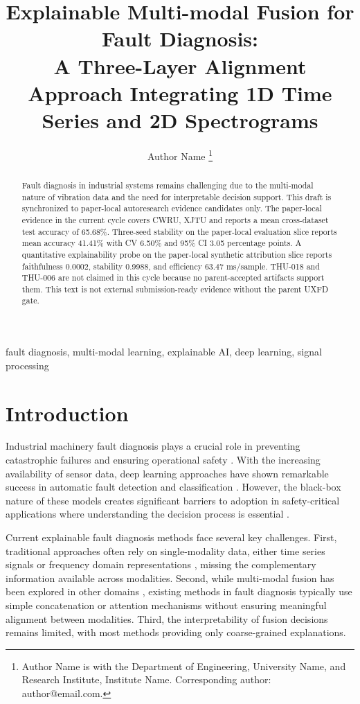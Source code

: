 \documentclass[journal]{IEEEtran}
\title{Explainable Multi-modal Fusion for Fault Diagnosis: \\
A Three-Layer Alignment Approach Integrating 1D Time Series and 2D Spectrograms}
\author{Author Name%
\thanks{Author Name is with the Department of Engineering, University Name, and Research Institute, Institute Name. Corresponding author: author@email.com.}}
\begin{document}
\maketitle

\begin{abstract}
Fault diagnosis in industrial systems remains challenging due to the multi-modal nature of vibration data and the need for interpretable decision support. This draft is synchronized to paper-local autoresearch evidence candidates only. The paper-local evidence in the current cycle covers CWRU, XJTU and reports a mean cross-dataset test accuracy of 65.68\%. Three-seed stability on the paper-local evaluation slice reports mean accuracy 41.41\% with CV 6.50\% and 95\% CI 3.05 percentage points. A quantitative explainability probe on the paper-local synthetic attribution slice reports faithfulness 0.0002, stability 0.9988, and efficiency 63.47 ms/sample. THU-018 and THU-006 are not claimed in this cycle because no parent-accepted artifacts support them. This text is not external submission-ready evidence without the parent UXFD gate.

\end{abstract}

\begin{IEEEkeywords}
fault diagnosis, multi-modal learning, explainable AI, deep learning, signal processing
\end{IEEEkeywords}

\section{Introduction}

Industrial machinery fault diagnosis plays a crucial role in preventing catastrophic failures and ensuring operational safety \cite{smith2020fault}. With the increasing availability of sensor data, deep learning approaches have shown remarkable success in automatic fault detection and classification \cite{liu2021deep, chen2022intelligent}. However, the black-box nature of these models creates significant barriers to adoption in safety-critical applications where understanding the decision process is essential \cite{rudin2019please}.

Current explainable fault diagnosis methods face several key challenges. First, traditional approaches often rely on single-modality data, either time series signals \cite{zhang2020intelligent} or frequency domain representations \cite{wang2021convolutional}, missing the complementary information available across modalities. Second, while multi-modal fusion has been explored in other domains \cite{ngiam2011multimodal}, existing methods in fault diagnosis typically use simple concatenation or attention mechanisms without ensuring meaningful alignment between modalities. Third, the interpretability of fusion decisions remains limited, with most methods providing only coarse-grained explanations.
\end{document}
